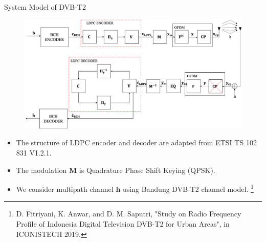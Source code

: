 \documentclass[11pt, aspectratio=169]{beamer}
\newcommand\blfootnote[1]{%
  \begingroup
  \renewcommand\thefootnote{}\footnote{#1}%
  \addtocounter{footnote}{-1}%
  \endgroup
}
\begin{document}


\begin{frame}{System Model of DVB-T2}
\vspace{-10pt}
\begin{figure}
\centering 
\includegraphics[scale=0.25]{gambarafa/sistemmo}
\label{sistemmodelMQCLDPC} %
\end{figure}
\vspace{-5pt}
\begin{itemize}
\item The structure of LDPC encoder and decoder are adapted from ETSI TS 102 831 V1.2.1.
\item The modulation $\mathbf{M}$ is Quadrature Phase Shift Keying (QPSK). 
\item We consider multipath channel $\mathbf{h}$ using Bandung DVB-T2 channel model.\blfootnote{\tiny{D. Fitriyani, K. Anwar, and D. M. Saputri, "Study on Radio Frequency Profile of Indonesia Digital Television DVB-T2 for Urban Areas", in ICONISTECH 2019.}}
\end{itemize}

\end{frame}
\end{document}

